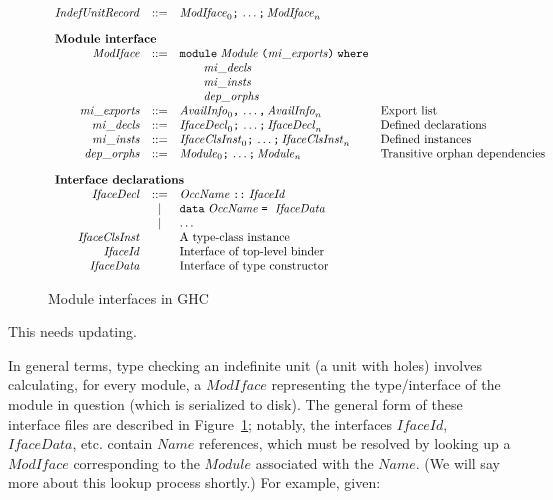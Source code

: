 \documentclass{article}
\newcommand{\I}[1]{\ensuremath{\mathit{#1}}}
\newcommand{\Red}[1]{{\color{red} #1}}
\begin{document}
\begin{figure}[htpb]
$$
\begin{array}{rcll}
\I{IndefUnitRecord} & ::= & \I{ModIface}_0 \verb|;|\, \ldots\verb|;|\, \I{ModIface}_n \\[1em]
\multicolumn{3}{l}{\mbox{\bf Module interface}} \\
\I{ModIface} & ::= & \verb|module| \; \I{Module} \; \verb|(| \I{mi\_exports} \verb|)| \; \verb|where| \\
& & \qquad \I{mi\_decls} \\
& & \qquad \I{mi\_insts} \\
& & \qquad \I{dep\_orphs} \\
\I{mi\_exports} & ::= & \I{AvailInfo}_0 \verb|,|\, \ldots \verb|,|\, \I{AvailInfo}_n & \mbox{Export list} \\
\I{mi\_decls} & ::= & \I{IfaceDecl}_0 \verb|;|\, \ldots \verb|;|\, \I{IfaceDecl}_n & \mbox{Defined declarations} \\
\I{mi\_insts} & ::= & \I{IfaceClsInst}_0 \verb|;|\, \ldots \verb|;|\, \I{IfaceClsInst}_n & \mbox{Defined instances} \\
\I{dep\_orphs} & ::= & \I{Module}_0 \verb|;|\, \ldots \verb|;|\, \I{Module}_n & \mbox{Transitive orphan dependencies} \\[1em]
\multicolumn{3}{l}{\mbox{\bf Interface declarations}} \\
\I{IfaceDecl} & ::= & \I{OccName} \; \verb|::| \; \I{IfaceId} \\
              & |   & \verb|data| \; \I{OccName} \; \verb|=| \;\ \I{IfaceData} \\
              & |   & \ldots \\
\I{IfaceClsInst} & & \mbox{A type-class instance} \\
\I{IfaceId} & & \mbox{Interface of top-level binder} \\
\I{IfaceData} & & \mbox{Interface of type constructor} \\
\end{array}
$$
\caption{Module interfaces in GHC} \label{fig:typecheck}
\end{figure}

\Red{This needs updating.}

In general terms,
type checking an indefinite unit (a unit with holes) involves
calculating, for every module, a \I{ModIface} representing the
type/interface of the module in question (which is serialized
to disk).  The general form of these
interface files are described in Figure~\ref{fig:typecheck}; notably,
the interfaces \I{IfaceId}, \I{IfaceData}, etc. contain \I{Name} references,
which must be resolved by
looking up a \I{ModIface} corresponding to the \I{Module} associated
with the \I{Name}. (We will say more about this lookup process shortly.)
For example, given:
\end{document}
